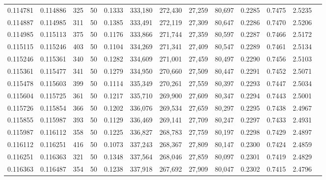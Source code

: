 \begin{tabular}{rrrrrrrrrrrrr}
0.114781 & 0.114886 &   325 &  50 &                                     0.1333 & 333,180 & 272,430 &  27,259 &  80,697 & 0.2285 & 0.7475 & 2.5235 \\
0.114887 & 0.114985 &   311 &  50 &                                     0.1385 & 333,491 & 272,119 &  27,309 &  80,647 & 0.2286 & 0.7470 & 2.5206 \\
0.114985 & 0.115113 &   375 &  50 &                                     0.1176 & 333,866 & 271,744 &  27,359 &  80,597 & 0.2287 & 0.7466 & 2.5172 \\
0.115115 & 0.115246 &   403 &  50 &                                     0.1104 & 334,269 & 271,341 &  27,409 &  80,547 & 0.2289 & 0.7461 & 2.5134 \\
0.115246 & 0.115361 &   340 &  50 &                                     0.1282 & 334,609 & 271,001 &  27,459 &  80,497 & 0.2290 & 0.7456 & 2.5103 \\
0.115361 & 0.115477 &   341 &  50 &                                     0.1279 & 334,950 & 270,660 &  27,509 &  80,447 & 0.2291 & 0.7452 & 2.5071 \\
0.115478 & 0.115603 &   399 &  50 &                                     0.1114 & 335,349 & 270,261 &  27,559 &  80,397 & 0.2293 & 0.7447 & 2.5034 \\
0.115604 & 0.115725 &   361 &  50 &                                     0.1217 & 335,710 & 269,900 &  27,609 &  80,347 & 0.2294 & 0.7443 & 2.5001 \\
0.115726 & 0.115854 &   366 &  50 &                                     0.1202 & 336,076 & 269,534 &  27,659 &  80,297 & 0.2295 & 0.7438 & 2.4967 \\
0.115855 & 0.115987 &   393 &  50 &                                     0.1129 & 336,469 & 269,141 &  27,709 &  80,247 & 0.2297 & 0.7433 & 2.4931 \\
0.115987 & 0.116112 &   358 &  50 &                                     0.1225 & 336,827 & 268,783 &  27,759 &  80,197 & 0.2298 & 0.7429 & 2.4897 \\
0.116112 & 0.116251 &   416 &  50 &                                     0.1073 & 337,243 & 268,367 &  27,809 &  80,147 & 0.2300 & 0.7424 & 2.4859 \\
0.116251 & 0.116363 &   321 &  50 &                                     0.1348 & 337,564 & 268,046 &  27,859 &  80,097 & 0.2301 & 0.7419 & 2.4829 \\
0.116363 & 0.116487 &   354 &  50 &                                     0.1238 & 337,918 & 267,692 &  27,909 &  80,047 & 0.2302 & 0.7415 & 2.4796 \\

\end{tabular}
